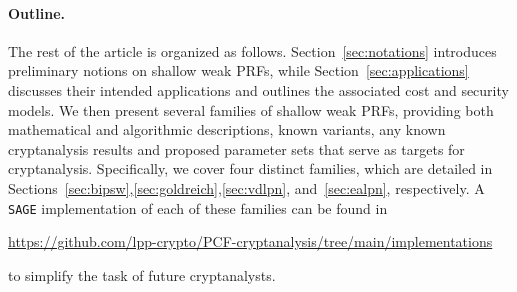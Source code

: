 \paragraph{Outline.} The rest of the article is organized as follows. Section~\ref{sec:notations} introduces preliminary notions on shallow weak PRFs, while Section~\ref{sec:applications} discusses their intended applications and outlines the associated cost and security models. We then present several families of shallow weak PRFs, providing both mathematical and algorithmic descriptions, known variants, any known cryptanalysis results and proposed parameter sets that serve as targets for cryptanalysis. Specifically, we cover four distinct families, which are detailed in Sections~\ref{sec:bipsw},\ref{sec:goldreich},\ref{sec:vdlpn}, and~\ref{sec:ealpn}, respectively. A \texttt{SAGE} implementation of each of these families can be found in
\begin{center}
\url{https://github.com/lpp-crypto/PCF-cryptanalysis/tree/main/implementations}
\end{center}
to simplify the task of future cryptanalysts.


